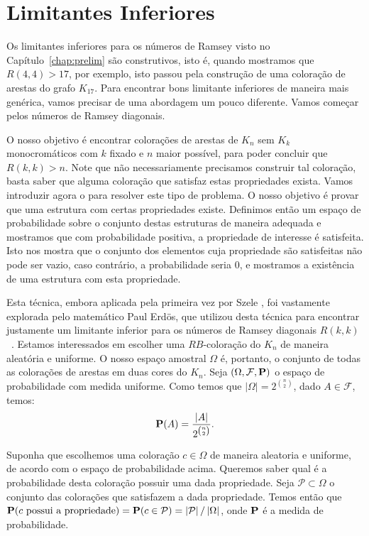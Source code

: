 
\section{Limitantes Inferiores}

Os limitantes inferiores para os números de Ramsey visto no Capítulo~\ref{chap:prelim} são construtivos, isto é, quando mostramos que $R(4,4) > 17$, por exemplo, isto passou pela construção de uma coloração de arestas do grafo $K_{17}$. Para encontrar bons limitante inferiores de maneira mais genérica, vamos precisar de uma abordagem um pouco diferente. Vamos começar pelos números de Ramsey diagonais.

O nosso objetivo é encontrar colorações de arestas de $K_n$ sem $K_k$ monocromáticos com $k$ fixado e $n$ maior possível, para poder concluir que $R(k,k) > n$. Note que não necessariamente precisamos construir tal coloração, basta saber que alguma coloração que satisfaz estas propriedades exista. Vamos introduzir agora o  para resolver este tipo de problema. O nosso objetivo é provar que uma estrutura com certas propriedades existe. Definimos então um espaço de probabilidade sobre o conjunto destas estruturas de maneira adequada e mostramos que com probabilidade positiva, a propriedade de interesse é satisfeita. Isto nos mostra que o conjunto dos elementos cuja propriedade são satisfeitas não pode ser vazio, caso contrário, a probabilidade seria 0, e mostramos a existência de uma estrutura com esta propriedade.

Esta técnica, embora aplicada pela primeira vez por Szele \cite{szele1943kombinatorikai}, foi vastamente explorada pelo matemático Paul Erdös, que utilizou desta técnica para encontrar justamente um limitante inferior para os números de Ramsey diagonais $R(k,k)$~\cite{erdos47}. Estamos interessados em escolher uma $RB$-coloração do $K_n$ de maneira aleatória e uniforme. O nosso espaço amostral $\Omega$ é, portanto, o conjunto de todas as colorações de arestas em duas cores do $K_n$. Seja $(\Omega, \mathcal{F}, \operatorname{\mathbf{P}})$ o espaço de probabilidade com medida uniforme. Como temos que $|\Omega| = 2^{\binom{n}{2}}$, dado $A \in \mathcal{F}$, temos:
\[ \operatorname{\mathbf{P}}(A) = \frac{|A|}{2^{\binom{n}{2}}}.\]

Suponha que escolhemos uma coloração $c \in \Omega$ de maneira aleatoria e uniforme, de acordo com o espaço de probabilidade acima. Queremos saber qual é a probabilidade desta coloração possuir uma dada propriedade. Seja $\mathcal{P} \subset \Omega$ o conjunto das colorações que satisfazem a dada propriedade. Temos então que $\operatorname{\mathbf{P}}(c \text{ possui a propriedade}) = \operatorname{\mathbf{P}}(c \in \mathcal{P}) = \left | \mathcal{P} \right | / \left | \Omega \right |$, onde $\operatorname{\mathbf{P}}$ é a medida de probabilidade.


